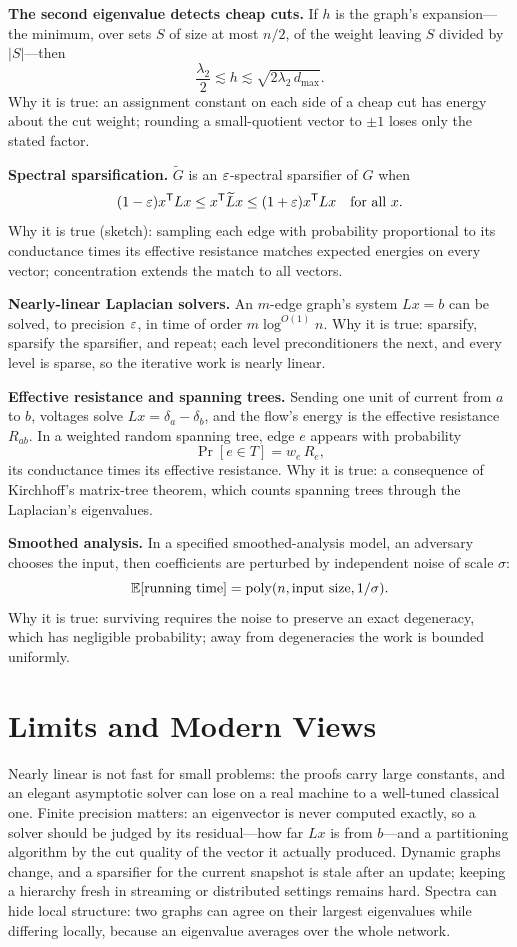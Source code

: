 \noindent\textbf{The second eigenvalue detects cheap cuts.} If $h$ is the graph's expansion---the minimum, over sets $S$ of size at most $n/2$, of the weight leaving $S$ divided by $|S|$---then
\[
\frac{\lambda_2}{2}\lesssim h\lesssim\sqrt{2\lambda_2\,d_{\max}}.
\]
Why it is true: an assignment constant on each side of a cheap cut has energy about the cut weight; rounding a small-quotient vector to $\pm1$ loses only the stated factor.

\noindent\textbf{Spectral sparsification.} $\widetilde G$ is an $\varepsilon$-spectral sparsifier of $G$ when
\[
(1-\varepsilon)x^{\mathsf T}Lx\leq x^{\mathsf T}\widetilde Lx\leq(1+\varepsilon)x^{\mathsf T}Lx\quad\text{for all }x.
\]
Why it is true (sketch): sampling each edge with probability proportional to its conductance times its effective resistance matches expected energies on every vector; concentration extends the match to all vectors.

\noindent\textbf{Nearly-linear Laplacian solvers.} An $m$-edge graph's system $Lx=b$ can be solved, to precision $\varepsilon$, in time of order $m\log^{O(1)}n$. Why it is true: sparsify, sparsify the sparsifier, and repeat; each level preconditioners the next, and every level is sparse, so the iterative work is nearly linear.

\noindent\textbf{Effective resistance and spanning trees.} Sending one unit of current from $a$ to $b$, voltages solve $Lx=\delta_a-\delta_b$, and the flow's energy is the effective resistance $R_{ab}$. In a weighted random spanning tree, edge $e$ appears with probability
\[
\Pr[e\in T]=w_e\,R_e,
\]
its conductance times its effective resistance. Why it is true: a consequence of Kirchhoff's matrix-tree theorem, which counts spanning trees through the Laplacian's eigenvalues.

\noindent\textbf{Smoothed analysis.} In a specified smoothed-analysis model, an adversary chooses the input, then coefficients are perturbed by independent noise of scale $\sigma$:
\[
\mathbb{E}[\text{running time}]=\operatorname{poly}(n,\text{input size},1/\sigma).
\]
Why it is true: surviving requires the noise to preserve an exact degeneracy, which has negligible probability; away from degeneracies the work is bounded uniformly.

\section{Limits and Modern Views}
Nearly linear is not fast for small problems: the proofs carry large constants, and an elegant asymptotic solver can lose on a real machine to a well-tuned classical one. Finite precision matters: an eigenvector is never computed exactly, so a solver should be judged by its residual---how far $Lx$ is from $b$---and a partitioning algorithm by the cut quality of the vector it actually produced. Dynamic graphs change, and a sparsifier for the current snapshot is stale after an update; keeping a hierarchy fresh in streaming or distributed settings remains hard. Spectra can hide local structure: two graphs can agree on their largest eigenvalues while differing locally, because an eigenvalue averages over the whole network.

